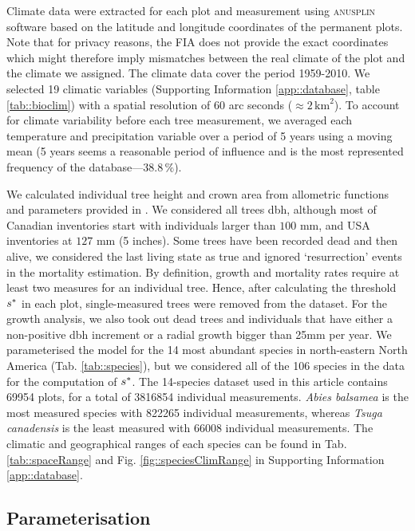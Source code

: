 Climate data were extracted for each plot and measurement using
\textsc{anusplin} software \citep{McKenney2011} based on the latitude and longitude
coordinates of the permanent plots. Note that for privacy reasons, the FIA does not provide the exact coordinates which might therefore imply mismatches between the real climate of the plot and the climate we assigned. The climate data cover the period 1959-2010. We selected 19 climatic variables (Supporting Information
\ref{app::database}, table \ref{tab::bioclim}) with a spatial resolution of
60 arc seconds ($ \approx 2 \, \text{km}^2 $). To account for climate variability before each tree measurement, we averaged each temperature and precipitation variable over a period of 5 years using a moving mean (5 years seems a reasonable period of influence and is the most represented frequency of the database---$ 38.8 \, \% $).

We calculated individual tree height and crown area from allometric functions
and parameters provided in \citet{Purves2007}. We considered all trees dbh,
although most of Canadian inventories start with individuals larger than $ 100 $ mm, and USA inventories at $ 127 $ mm (5 inches). Some trees have been
recorded dead and then alive, we considered the last living state as true and
ignored `resurrection' events in the mortality estimation.
By definition, growth and mortality rates require at least two measures for an
individual tree. Hence, after calculating the threshold $ {s}^{*} $ in each plot,
single-measured trees were removed from the dataset. For the growth analysis,
we also took out dead trees and individuals that have either a non-positive
dbh increment or a radial growth bigger than 25mm per year. We parameterised
the model for the 14 most abundant species in north-eastern North America
(Tab. \ref{tab::species}), but we considered all of the 106 species in the
data for the computation of $ {s}^{*} $. The 14-species dataset used in this
article contains \num{69954} plots, for a total of \num{3816854} individual
measurements. \textit{Abies balsamea} is the most measured species with \num{822265} individual measurements, whereas \textit{Tsuga canadensis} is the least measured with \num{66008} individual measurements. The climatic and geographical ranges of each species can be found in Tab. \ref{tab::spaceRange} and Fig. \ref{fig::speciesClimRange} in Supporting Information \ref{app::database}.

\subsection{Parameterisation}

